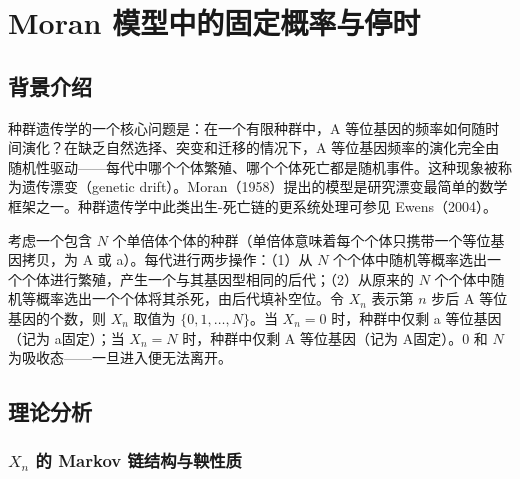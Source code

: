 \section{Moran 模型中的固定概率与停时}

\subsection{背景介绍}

种群遗传学的一个核心问题是：在一个有限种群中，A 等位基因的频率如何随时间演化？在缺乏自然选择、突变和迁移的情况下，A 等位基因频率的演化完全由随机性驱动——每代中哪个个体繁殖、哪个个体死亡都是随机事件。这种现象被称为遗传漂变（genetic drift）。Moran（1958）提出的模型是研究漂变最简单的数学框架之一\cite{moran1958random}。种群遗传学中此类出生-死亡链的更系统处理可参见 Ewens（2004）\cite{ewens2004mathematical}。

考虑一个包含 $N$ 个单倍体个体的种群（单倍体意味着每个个体只携带一个等位基因拷贝，为 A 或 a）。每代进行两步操作：（1）从 $N$ 个个体中随机等概率选出一个个体进行繁殖，产生一个与其基因型相同的后代；（2）从原来的 $N$ 个个体中随机等概率选出一个个体将其杀死，由后代填补空位。令 $X_n$ 表示第 $n$ 步后 A 等位基因的个数，则 $X_n$ 取值为 $\{0, 1, \dots, N\}$。当 $X_n = 0$ 时，种群中仅剩 a 等位基因（记为 a固定）；当 $X_n = N$ 时，种群中仅剩 A 等位基因（记为 A固定）。0 和 $N$ 为吸收态——一旦进入便无法离开。

\subsection{理论分析}\label{sec:moran_theory}

\subsubsection{$X_n$ 的 Markov 链结构与鞅性质}

